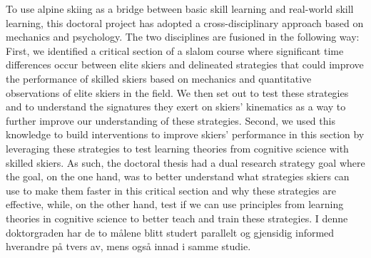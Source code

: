 To use alpine skiing as a bridge between basic skill learning and real-world skill learning, this doctoral project has adopted a cross-disciplinary approach based on mechanics and psychology. The two disciplines are fusioned in the following way: First, we identified a critical section of a slalom course where significant time differences occur between elite skiers and delineated strategies that could improve the performance of skilled skiers based on mechanics and quantitative observations of elite skiers in the field. We then set out to test these strategies and to understand the signatures they exert on skiers' kinematics as a way to further improve our understanding of these strategies. Second, we used this knowledge to build interventions to improve skiers' performance in this section by leveraging these strategies to test learning theories from cognitive science with skilled skiers. As such, the doctoral thesis had a dual research strategy goal where the goal, on the one hand, was to better understand what strategies skiers can use to make them faster in this critical section and why these strategies are effective, while, on the other hand, test if we can use principles from learning theories in cognitive science to better teach and train these strategies. I denne doktorgraden har de to målene blitt studert parallelt og gjensidig informed hverandre på tvers av, mens også innad i samme studie. 




